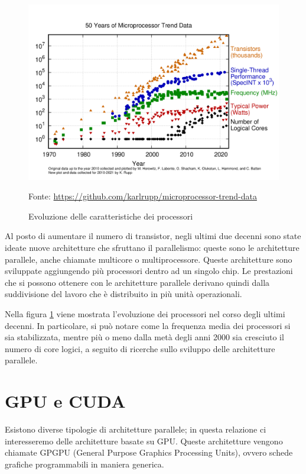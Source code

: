 \documentclass[12pt,a4paper,openright,twoside]{report}
\newcommand{\source}[1]{\vspace{-10pt} \caption*{\scriptsize Fonte: {#1}} }
\begin{document}
\begin{figure}[h]
    \centering
    \includegraphics[width=\textwidth]{50-years-processor-trend.png}
    \caption{Evoluzione delle caratteristiche dei processori}
    \source{\url{https://github.com/karlrupp/microprocessor-trend-data}}
    \label{img:trend_proc}
\end{figure}

Al posto di aumentare il numero di transistor, negli ultimi due decenni sono state ideate nuove architetture che sfruttano il parallelismo: queste sono le architetture parallele, anche chiamate multicore o multiprocessore. Queste architetture sono sviluppate aggiungendo più processori dentro ad un singolo chip. Le prestazioni che si possono ottenere con le architetture parallele derivano quindi dalla suddivisione del lavoro che è distribuito in più unità operazionali.

Nella figura \ref{img:trend_proc} viene mostrata l'evoluzione dei processori nel corso degli ultimi decenni. In particolare, si può notare come la frequenza media dei processori si sia stabilizzata, mentre più o meno dalla metà degli anni 2000 sia cresciuto il numero di core logici, a seguito di ricerche sullo sviluppo delle architetture parallele.

\section{GPU e CUDA}

Esistono diverse tipologie di architetture parallele; in questa relazione ci interesseremo delle architetture basate su GPU. Queste architetture vengono chiamate GPGPU (General Purpose Graphics Processing Units), ovvero schede grafiche programmabili in maniera generica.
\end{document}
